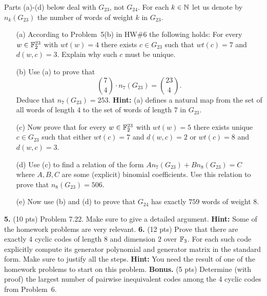 \documentclass[12pt]{amsart}
\begin{document}
Parts (a)-(d) below deal with $G_{23}$, not $G_{24}$. For each $k\in{\mathbb N}$ let us denote by $n_k(G_{23})$ the number of words of weight $k$ in $G_{23}$.
\begin{itemize}
\item[(a)] According to Problem~5(b) in HW\#6 the following holds: For every $w\in {\mathbb F}_2^{23}$ with $wt(w)=4$ there exists $c\in G_{23}$
such that $wt(c)=7$ and $d(w,c)=3$. Explain why such $c$ must be unique.
\item[(b)] Use (a) to prove that $${7 \choose 4}\cdot n_{7}(G_{23})={23 \choose 4}.$$ Deduce that
$n_7(G_{23})=253$. {\bf Hint:} (a) defines a natural map from the set of all words of length $4$ to the set of words of length $7$ in $G_{23}$.


\item[(c)] Now prove that for every $w\in {\mathbb F}_2^{23}$ with $wt(w)=5$ there exists unique $c\in G_{23}$ such that either $wt(c)=7$ and $d(w,c)=2$ or $wt(c)=8$ and $d(w,c)=3$. 
\item[(d)] Use (c) to find a relation of the form $A n_7(G_{23}) + B n_8(G_{23})=C$ where $A,B,C$ are some (explicit) binomial coefficients. Use this relation to prove that $n_8(G_{23})=506$.
\item[(e)] Now use (b) and (d) to prove that $G_{24}$ has exactly $759$ words of weight $8$.
\end{itemize}
\skv
{\bf 5.} (10 pts) Problem 7.22. Make sure to give a detailed argument. {\bf Hint:} Some of the homework problems are very relevant.
\skv
{\bf 6.} (12 pts) Prove that there are exactly $4$ cyclic codes of length $8$ and dimension $2$ over ${\mathbb F}_3$. For each such code explicitly compute its generator polynomial and generator matrix in the standard form. Make sure to justify all the steps. {\bf Hint:} You need the result of one of the homework problems to start on this problem.
\skv
{\bf Bonus.} (5 pts) Determine (with proof) the largest number of pairwise inequivalent codes among the 4 cyclic codes from Problem~6.
\end{document}
